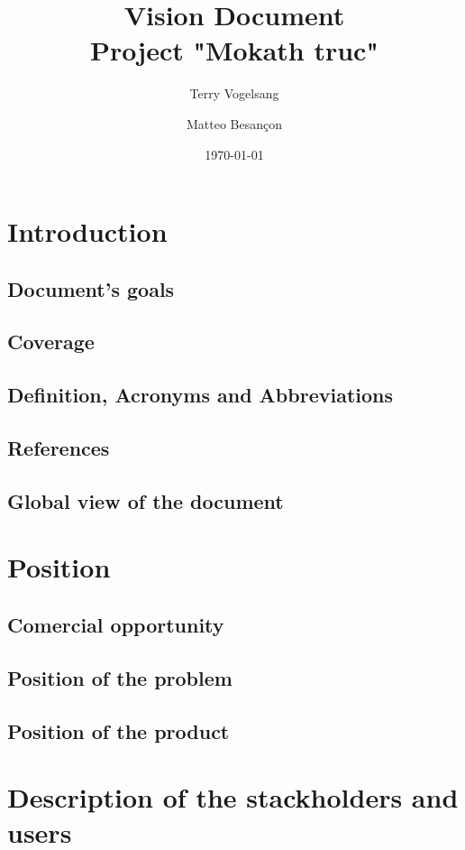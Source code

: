 \documentclass[12pt,a4paper,oneside, titlepage]{article}
\author{Terry Vogelsang \and Matteo Besançon}
\title {Vision Document \\ \large Project "Mokath truc"}
\date{\today}
\begin{document}
	\renewcommand{\labelitemi}{$\bullet$}
	\maketitle
	\tableofcontents
	\newpage

	\section{Introduction}
		\subsection{Document's goals}
		\subsection{Coverage}
		\subsection{Definition, Acronyms and Abbreviations}
		\subsection{References}
		\subsection{Global view of the document}

	\section{Position}
		\subsection{Comercial opportunity}
		\subsection{Position of the problem}
		\subsection{Position of the product}

	\section{Description of the stackholders and users}
\end{document}
